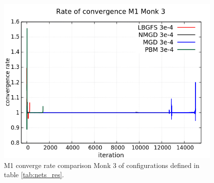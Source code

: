 \begin{figure}[H]
	\centering
	\includegraphics[width=0.6\linewidth]{data/Comparison/Monk3/Monk3_M1_CR_standard.png}
	\caption{M1 converge rate comparison Monk 3 of configurations defined in table \ref{tab:nets_res}.}
	\label{fig:CR-M1-Monk3-Standard}
\end{figure}

